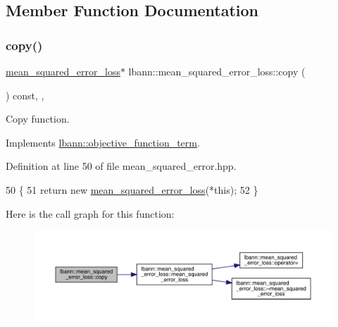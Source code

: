\subsection{Member Function Documentation}
\mbox{\label{classlbann_1_1mean__squared__error__loss_aac723abb01bb19090018b3bddc9b49b0}} 
\subsubsection{\texorpdfstring{copy()}{copy()}}
{\footnotesize\ttfamily \hyperlink{classlbann_1_1mean__squared__error__loss}{mean\+\_\+squared\+\_\+error\+\_\+loss}$\ast$ lbann\+::mean\+\_\+squared\+\_\+error\+\_\+loss\+::copy (\begin{DoxyParamCaption}{ }\end{DoxyParamCaption}) const\hspace{0.3cm}{\ttfamily [inline]}, {\ttfamily [override]}, {\ttfamily [virtual]}}

Copy function. 

Implements \hyperlink{classlbann_1_1objective__function__term_ae98a4ec173a602ad55d1df20dadd4cb9}{lbann\+::objective\+\_\+function\+\_\+term}.



Definition at line 50 of file mean\+\_\+squared\+\_\+error.\+hpp.


\begin{DoxyCode}
50                                                  \{
51     \textcolor{keywordflow}{return} \textcolor{keyword}{new} \hyperlink{classlbann_1_1mean__squared__error__loss_a97883c4e1491dcf28f21179b62090c48}{mean\_squared\_error\_loss}(*\textcolor{keyword}{this});
52   \}
\end{DoxyCode}
Here is the call graph for this function\+:\nopagebreak
\begin{figure}[H]
\begin{center}
\leavevmode
\includegraphics[width=350pt]{classlbann_1_1mean__squared__error__loss_aac723abb01bb19090018b3bddc9b49b0_cgraph}
\end{center}
\end{figure}
\mbox{\label{classlbann_1_1mean__squared__error__loss_aef698469d2e70a5d42e402eeca50efa3}} 
